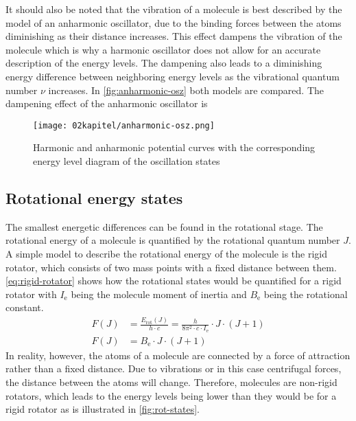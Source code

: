 It should also be noted that the vibration of a molecule is best described by the model of an anharmonic oscillator, due to the binding forces between the atoms diminishing as their distance increases. This effect dampens the vibration of the molecule which is why a harmonic oscillator does not allow for an accurate description of the energy levels. The dampening also leads to a diminishing energy difference between neighboring energy levels as the vibrational quantum number $\nu$ increases. In \autoref{fig:anharmonic-osz} both models are compared. The dampening effect of the anharmonic oscillator is 

\begin{figure}[!htb]
    \centering
    \texttt{[image: 02kapitel/anharmonic-osz.png]}
    \caption[Model of an anharmonic oszillator]{Harmonic and anharmonic potential curves with the corresponding energy level diagram
    of the oscillation states \autocite{brauerApplicationRamanSpectroscopy2022}}
    \label{fig:anharmonic-osz}
\end{figure}

\subsection{Rotational energy states}

The smallest energetic differences can be found in the rotational stage. The rotational energy of a molecule is quantified by the rotational quantum number $J$. A simple model to describe the rotational energy of the molecule is the rigid rotator, which consists of two mass points with a fixed distance between them. \autoref{eq:rigid-rotator} shows how the rotational states would be quantified for a rigid rotator with $I_\mathrm{e}$ being the molecule moment of inertia and $B_\mathrm{e}$ being the rotational constant.
\begin{align}
    F(J)&=\frac{E_\mathrm{rot}(J)}{h \cdot c}=\frac{h}{8\pi^2 \cdot c \cdot I_\mathrm{e}} \cdot J \cdot (J+1) \nonumber \\[6pt]
    F(J)&=B_\mathrm{e} \cdot J \cdot (J+1) \label{eq:rigid-rotator}
\end{align}
In reality, however, the atoms of a molecule are connected by a force of attraction rather than a fixed distance.  Due to vibrations or in this case centrifugal forces, the distance between the atoms will change. Therefore, molecules are non-rigid rotators, which leads to the energy levels being lower than they would be for a rigid rotator as is illustrated in \autoref{fig:rot-states}.


